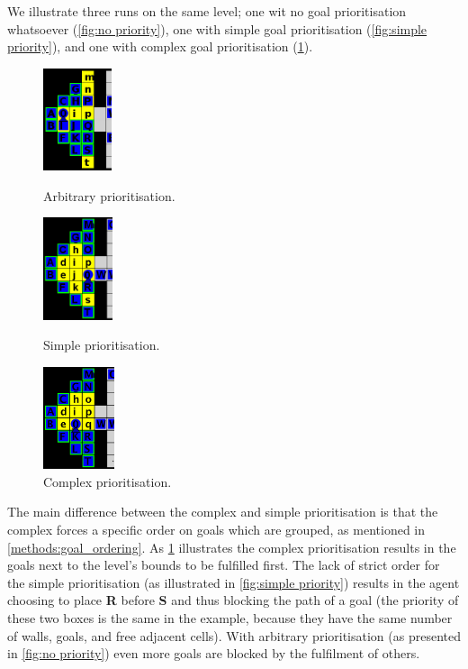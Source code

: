 We illustrate three runs on the same level; 
one wit no goal prioritisation whatsoever (\cref{fig:no priority}),
one with simple goal prioritisation (\cref{fig:simple priority}), and 
one with complex goal prioritisation (\cref{fig:complex_priority}). 

\begin{figure}[h!]
  \centering
  \begin{minipage}{.30\columnwidth}
    \centering
    \includegraphics[height=3cm]{graphics/no_priority_block.png}
    \caption{\label{fig:no priority}Arbi\-tra\-ry prioritisation.}
  \end{minipage}%
  \hspace{10pt}%
  \begin{minipage}{.30\columnwidth}
    \centering
    \includegraphics[height=3cm]{graphics/simple_priority_block.PNG}
    \caption{\label{fig:simple priority}Simple prioritisation.}
  \end{minipage}%
  \hspace{10pt}%
  \begin{minipage}{.30\columnwidth}
    \centering
    \includegraphics[height=3cm]{graphics/complex_priority.png}
    \caption{\label{fig:complex_priority}Comp\-lex prioritisation.}
  \end{minipage}
\end{figure}

The main difference between the complex and simple prioritisation is that the complex forces a specific order on goals which are grouped, as mentioned in \cref{methods:goal_ordering}.
As \cref{fig:complex_priority} illustrates the complex prioritisation results in the goals next to the level's bounds to be fulfilled first. 
The lack of strict order for the simple prioritisation (as illustrated in \cref{fig:simple priority}) results in the agent choosing to place \textbf{R} before \textbf{S} and thus blocking the path of a goal (the priority of these two boxes is the same in the example, because they have the same number of walls, goals, and free adjacent cells).
With arbitrary prioritisation (as presented in \cref{fig:no priority}) even more goals are blocked by the fulfilment of others.

